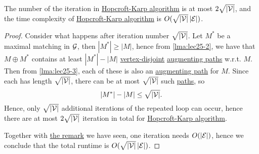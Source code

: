 \begin{theorem}
	The number of the iteration in \hyperref[algo:Hopcroft-Karp-algorithm]{Hopcroft-Karp algorithm} is at most \(2\sqrt{\left\vert \mathcal{\MakeUppercase{v}}  \right\vert } \),
	and the time complexity of \hyperref[algo:Hopcroft-Karp-algorithm]{Hopcroft-Karp algorithm} is \(O(\sqrt{\left\vert \mathcal{\MakeUppercase{v}}  \right\vert } \left\vert \mathcal{\MakeUppercase{e}}  \right\vert )\).
\end{theorem}
\begin{proof}
	Consider what happens after iteration number \(\sqrt{\left\vert \mathcal{\MakeUppercase{v}}  \right\vert } \). Let \(M^{\ast} \) be a maximal matching in \(\mathcal{\MakeUppercase{g}} \),
	then \(\left\vert M^{\ast}  \right\vert \geq \left\vert M \right\vert \), hence from \autoref{lma:lec25-2}, we have that \(M\oplus M^{\ast} \)
	contains at least \(\left\vert M^{\ast}  \right\vert - \left\vert M \right\vert \) \hyperref[def:vertex-independent]{vertex-disjoint}
	\hyperref[def:augmenting-path]{augmenting paths} w.r.t. \(M\). Then from \autoref{lma:lec25-3}, each of these is also an \hyperref[def:augmenting-path]{augmenting path}
	for \(M\). Since each has length \(\sqrt{\left\vert \mathcal{\MakeUppercase{v}}  \right\vert } \), there can be at most \(\sqrt{\left\vert \mathcal{\MakeUppercase{v}}  \right\vert } \)
	such \hyperref[def:path]{paths}, so
	\[
		\left\vert M^{\ast}  \right\vert - \left\vert M \right\vert \leq \sqrt{\left\vert \mathcal{\MakeUppercase{v}}  \right\vert } .
	\]
	Hence, only \(\sqrt{\left\vert \mathcal{\MakeUppercase{v}}  \right\vert } \) additional iterations of the repeated loop can occur, hence there are
	at most \(2 \sqrt{ \left\vert \mathcal{\MakeUppercase{v}}  \right\vert } \) iteration in total for \hyperref[algo:Hopcroft-Karp-algorithm]{Hopcroft-Karp algorithm}.

	Together with \hyperref[rmk:lec25-1]{the remark} we have seen, one iteration needs \(O(\left\vert \mathcal{\MakeUppercase{E}}  \right\vert )\), hence we conclude that
	the total runtime is \(O(\sqrt{\left\vert \mathcal{\MakeUppercase{v}}  \right\vert } \left\vert \mathcal{\MakeUppercase{e}}  \right\vert )\).
\end{proof}

